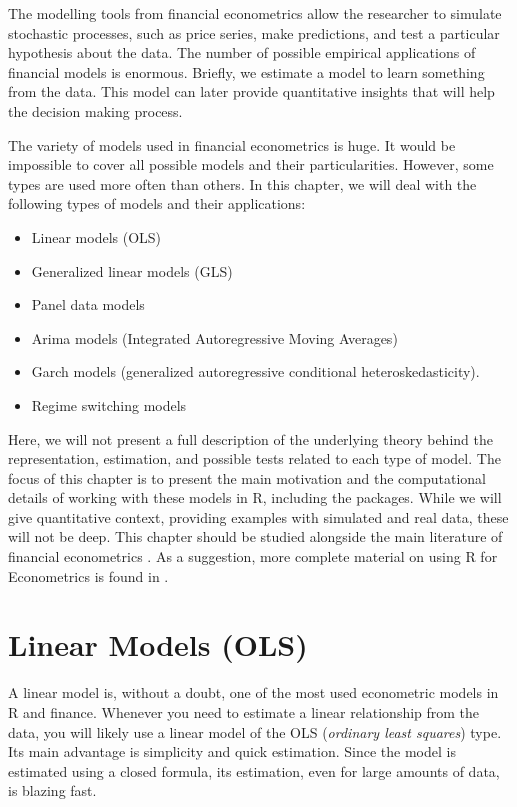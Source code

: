\documentclass[11pt,]{book}
\providecommand{\tightlist}{%
  \setlength{\itemsep}{0pt}\setlength{\parskip}{0pt}}
\begin{document}
The modelling tools from financial econometrics allow the researcher to
simulate stochastic processes, such as price series, make predictions,
and test a particular hypothesis about the data. The number of possible
empirical applications of financial models is enormous. Briefly, we
estimate a model to learn something from the data. This model can later
provide quantitative insights that will help the decision making
process.

The variety of models used in financial econometrics is huge. It would
be impossible to cover all possible models and their particularities.
However, some types are used more often than others. In this chapter, we
will deal with the following types of models and their applications:

\begin{itemize}
\tightlist
\item
  Linear models (OLS)
\item
  Generalized linear models (GLS)
\item
  Panel data models
\item
  Arima models (Integrated Autoregressive Moving Averages)
\item
  Garch models (generalized autoregressive conditional
  heteroskedasticity).
\item
  Regime switching models
\end{itemize}

Here, we will not present a full description of the underlying theory
behind the representation, estimation, and possible tests related to
each type of model. The focus of this chapter is to present the main
motivation and the computational details of working with these models in
R, including the packages. While we will give quantitative context,
providing examples with simulated and real data, these will not be deep.
This chapter should be studied alongside the main literature of
financial econometrics \citep[\citet{brooks2014introductory},
\citet{hamilton1994time},
\citet{greene2003econometric}]{campbell1997econometrics}. As a
suggestion, more complete material on using R for Econometrics is found
in \citet{kleiber2008applied}.

\section{Linear Models (OLS)}\label{linear-models-ols}

A linear model is, without a doubt, one of the most used econometric
models in R and finance. Whenever you need to estimate a linear
relationship from the data, you will likely use a linear model of the
OLS (\emph{ordinary least squares}) type. Its main advantage is
simplicity and quick estimation. Since the model is estimated using a
closed formula, its estimation, even for large amounts of data, is
blazing fast.
\end{document}
